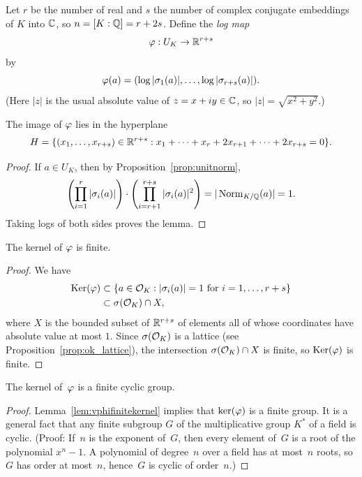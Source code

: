 Let $r$ be the number of real and $s$ the number of complex conjugate
embeddings of $K$ into $\mathbb{C}$, so $n=[K:\mathbb{Q}]=r+2s$.
Define the {\em log map}
$$
\varphi:U_K \to \mathbb{R}^{r+s}
$$
by 
$$
 \varphi(a) = (\log|\sigma_1(a)|,\ldots, \log|\sigma_{r+s}(a)|).
$$
(Here $|z|$ is the usual absolute value of $z=x+iy\in\mathbb{C}$, 
so $|z|=\sqrt{x^2+y^2}$.)

\begin{lemma}\label{lem:inh}
The image of $\varphi$ lies in the hyperplane 
\begin{equation}\label{eqn:hyperplane}
H = \{(x_1,\ldots, x_{r+s})\in\mathbb{R}^{r+s} : 
  x_1+ \cdots + x_r + 2x_{r+1} + \cdots + 2x_{r+s} = 0\}.
\end{equation}
\end{lemma}
\begin{proof}
If $a\in U_K$, then 
by Proposition~\ref{prop:unitnorm}, 
$$\left(\prod_{i=1}^{r} |\sigma_i(a)|\right) 
  \cdot \left( \prod_{i=r+1}^{r+s} |\sigma_i(a)|^2 \right) = 
|\operatorname{Norm}_{K/\mathbb{Q}}(a)| = 1.$$
Taking logs of both sides proves the lemma.
\end{proof}

\begin{lemma}\label{lem:vphifinitekernel}
The kernel of $\varphi$ is finite.
\end{lemma}
\begin{proof}
We have
\begin{align*}
  \operatorname{Ker}(\varphi) &\subset \{a\in\mathcal{O}_K : |\sigma_i(a)| = 1 \text{ for }i=1,\ldots,r+s\}\\
              &\subset \sigma(\mathcal{O}_K) \cap X,
\end{align*}
where $X$ is the bounded subset of $\mathbb{R}^{r+s}$ of elements all of whose coordinates
have absolute value at most $1$.  Since $\sigma(\mathcal{O}_K)$ is a lattice 
(see Proposition~\ref{prop:ok_lattice}), 
the intersection $\sigma(\mathcal{O}_K)\cap X$ is finite, so $\operatorname{Ker}(\varphi)$ is finite.
\end{proof}

\begin{lemma}\label{lem:kerfcg}
The kernel of~$\varphi$ is a finite cyclic group.
\end{lemma}
\begin{proof}
  Lemma~\ref{lem:vphifinitekernel} implies that $\ker(\varphi)$ is a
  finite group.  It is a general fact that any finite subgroup $G$ of
  the multiplicative group $K^*$ of a field is cyclic.  (Proof: If~$n$
  is the exponent of~$G$, then every element of~$G$ is a root of the
  polynomial $x^n-1$.  A polynomial of degree~$n$ over a field has at
  most~$n$ roots, so $G$ has order at most~$n$, hence~$G$ is cyclic of
  order~$n$.)
\end{proof}

